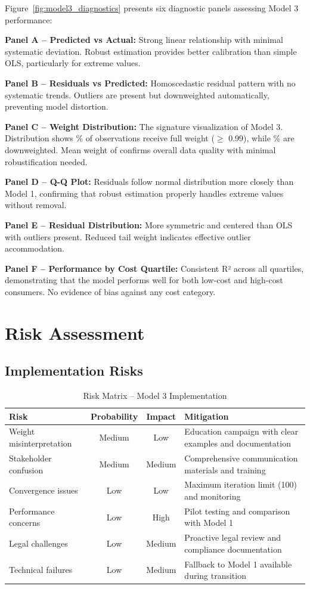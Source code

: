 Figure~\ref{fig:model3_diagnostics} presents six diagnostic panels assessing Model 3 performance:

\textbf{Panel A -- Predicted vs Actual:}
Strong linear relationship with minimal systematic deviation. Robust estimation provides better calibration than simple OLS, particularly for extreme values.

\textbf{Panel B -- Residuals vs Predicted:}
Homoscedastic residual pattern with no systematic trends. Outliers are present but downweighted automatically, preventing model distortion.

\textbf{Panel C -- Weight Distribution:}
The signature visualization of Model 3. Distribution shows \ModelThreeFullWeightPct{}\% of observations receive full weight ($\geq$ 0.99), while \ModelThreeOutlierPercentage{}\% are downweighted. Mean weight of \ModelThreeMeanWeight{} confirms overall data quality with minimal robustification needed.

\textbf{Panel D -- Q-Q Plot:}
Residuals follow normal distribution more closely than Model 1, confirming that robust estimation properly handles extreme values without removal.

\textbf{Panel E -- Residual Distribution:}
More symmetric and centered than OLS with outliers present. Reduced tail weight indicates effective outlier accommodation.

\textbf{Panel F -- Performance by Cost Quartile:}
Consistent R² across all quartiles, demonstrating that the model performs well for both low-cost and high-cost consumers. No evidence of bias against any cost category.

\section{Risk Assessment}

\subsection{Implementation Risks}

\begin{table}[h]
\centering
\caption{Risk Matrix -- Model 3 Implementation}
\begin{tabular}{p{3.5cm}ccp{5cm}}
\toprule
\textbf{Risk} & \textbf{Probability} & \textbf{Impact} & \textbf{Mitigation} \\
\midrule
Weight misinterpretation & Medium & Low & Education campaign with clear examples and documentation \\
Stakeholder confusion & Medium & Medium & Comprehensive communication materials and training \\
Convergence issues & Low & Low & Maximum iteration limit (100) and monitoring \\
Performance concerns & Low & High & Pilot testing and comparison with Model 1 \\
Legal challenges & Low & Medium & Proactive legal review and compliance documentation \\
Technical failures & Low & Medium & Fallback to Model 1 available during transition \\
\bottomrule
\end{tabular}
\end{table}

